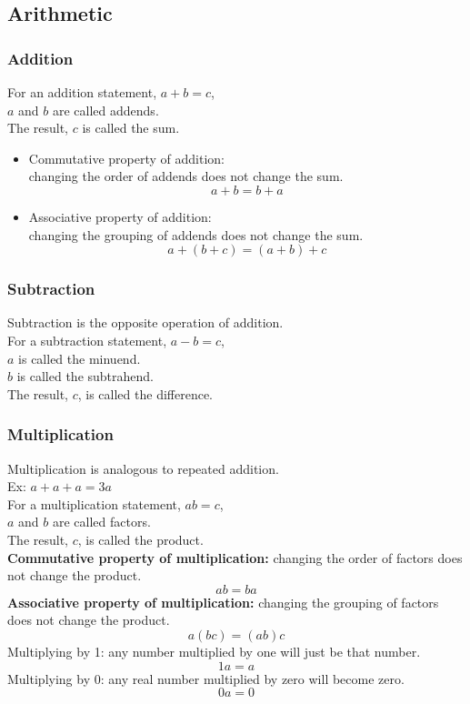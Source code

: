 \documentclass[11pt, fleqn]{article}
\begin{document}
\subsection{Arithmetic}

\subsubsection{Addition}
For an addition statement, $a+b=c$,\\
$a$ and $b$ are called addends.\\
The result, $c$ is called the sum.
\begin{itemize}
    \item Commutative property of addition:\\
    changing the order of addends does not change the sum.
    $$a+b=b+a$$
    \item Associative property of addition:\\
    changing the grouping of addends does not change the sum.
    $$a+(b+c)=(a+b)+c$$
\end{itemize}



\subsubsection{Subtraction}
Subtraction is the opposite operation of addition.\\
For a subtraction statement, $a-b=c$,\\
$a$ is called the minuend.\\
$b$ is called the subtrahend.\\
The result, $c$, is called the difference.

\subsubsection{Multiplication}
Multiplication is analogous to repeated addition.\\
Ex: $a+a+a=3a$\\
For a multiplication statement, $ab=c$,\\
$a$ and $b$ are called factors.\\
The result, $c$, is called the product.\\
\textbf{Commutative property of multiplication:} changing the order of factors does not change the product.
$$ab=ba$$
\textbf{Associative property of multiplication:} changing the grouping of factors does not change the product.
$$a(bc)=(ab)c$$
Multiplying by 1: any number multiplied by one will just be that number.
$$1a=a$$
Multiplying by 0: any real number multiplied by zero will become zero.
$$0a=0$$
\end{document}
